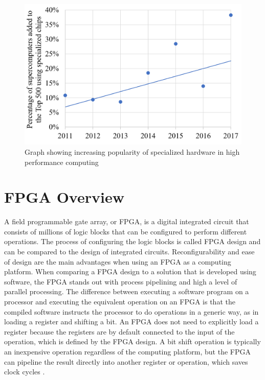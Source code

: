 \documentclass[12pt]{report}
\begin{document}
\begin{figure}
    \centering
    \includegraphics[scale=0.4]{figures/Supercomputers-with-pecialized-chips.png}
    \caption{Graph showing increasing popularity of 
specialized hardware in high performance computing \citep{GenPurpTech}}
    \label{fig:1}
\end{figure}

\section{FPGA Overview}
A field programmable gate array, or FPGA, is a digital integrated circuit that consists of millions of logic blocks that can be configured to perform different operations. The process of configuring the logic blocks is called FPGA design and can be compared to the design of integrated circuits. Reconfigurability and ease of design are the main advantages when using an FPGA as a computing platform. When comparing a FPGA design to a solution that is developed using software, the FPGA stands out with process pipelining and high a level of parallel processing. The difference between executing a software program on a processor and executing the equivalent operation on an FPGA is that the compiled software instructs the processor to do operations in a generic way, as in loading a register and shifting a bit. An FPGA does not need to explicitly load a register because the registers are by default connected to the input of the operation, which is defined by the FPGA design. A bit shift operation is typically an inexpensive operation regardless of the computing platform, but the FPGA can pipeline the result directly into another register or operation, which saves clock cycles \citep{XilFPGAIntro}.
  
\end{document}
